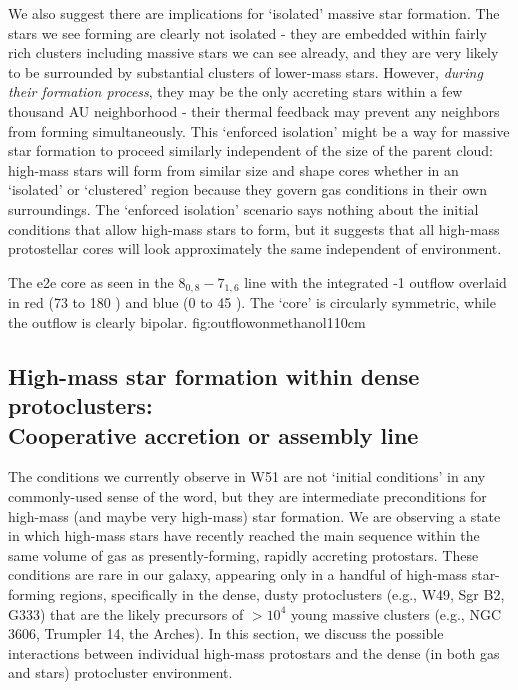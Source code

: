 \documentclass{emulateapj}
\begin{document}
We also suggest there are implications for `isolated' massive star formation.
The stars we see forming are clearly not isolated - they are embedded within
fairly rich clusters including massive stars we can see already, and they are
very likely to be surrounded by substantial clusters of lower-mass stars.
However, \emph{during their formation process}, they may be the only accreting
stars within a few thousand AU neighborhood - their thermal feedback may
prevent any neighbors from forming simultaneously.  This `enforced isolation'
might be a way for massive star formation to proceed similarly independent of
the size of the parent cloud: high-mass stars will form from similar size and
shape cores whether in an `isolated' or `clustered' region because they govern
gas conditions in their own surroundings.  The `enforced isolation' scenario
says nothing about the initial conditions that allow high-mass stars to form,
but it suggests that all high-mass protostellar cores will look approximately
the same independent of environment.

 
{The e2e core as seen in the \methanol $8_{0,8}-7_{1,6}$ line with
the integrated -1 outflow overlaid in red (73 to 180 \kms) and blue
(0 to 45 \kms).  The `core' is circularly symmetric, while the outflow is
clearly bipolar.}
{fig:outflowonmethanol}{1}{10cm}


\subsection{High-mass star formation within dense protoclusters:\\
Cooperative accretion or assembly line}
\label{sec:cooperative}
The conditions we currently observe in W51 are not `initial conditions' in any
commonly-used sense of the word, but they are intermediate preconditions for
high-mass (and maybe very high-mass) star formation.  We are observing a state
in which high-mass stars have recently reached the main sequence within the
same volume of gas as presently-forming, rapidly accreting protostars.  These
conditions are rare in our galaxy, appearing only in a handful of high-mass
star-forming regions, specifically in the dense, dusty protoclusters (e.g.,
W49, Sgr B2, G333) that are the likely precursors of $>10^4$ \msun young
massive clusters (e.g., NGC 3606, Trumpler 14, the Arches).  In this section,
we discuss the possible interactions between individual high-mass protostars
and the dense (in both gas and stars) protocluster environment.
\end{document}
